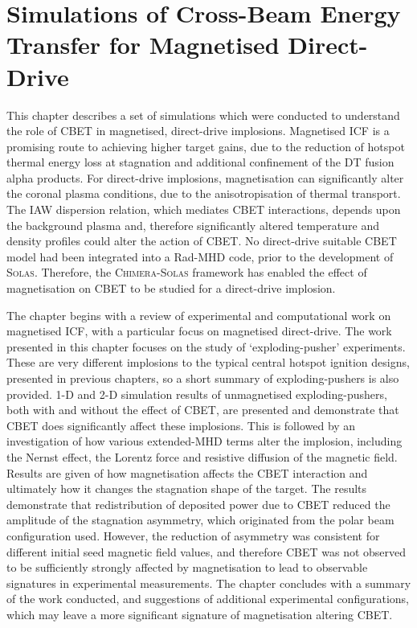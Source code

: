 \chapter{Simulations of Cross-Beam Energy Transfer for Magnetised Direct-Drive}%
\label{chap:Mag}

This chapter describes a set of simulations which were conducted to understand the role of \ac{CBET} in magnetised, direct-drive implosions.
Magnetised \ac{ICF} is a promising route to achieving higher target gains, due to the reduction of hotspot thermal energy loss at stagnation and additional confinement of the DT fusion alpha products.
For direct-drive implosions, magnetisation can significantly alter the coronal plasma conditions, due to the anisotropisation of thermal transport.
The \ac{IAW} dispersion relation, which mediates \ac{CBET} interactions, depends upon the background plasma and, therefore significantly altered temperature and density profiles could alter the action of \ac{CBET}.
No direct-drive suitable \ac{CBET} model had been integrated into a \ac{Rad-MHD} code, prior to the development of \textsc{Solas}.
Therefore, the \textsc{Chimera}-\textsc{Solas} framework has enabled the effect of magnetisation on \ac{CBET} to be studied for a direct-drive implosion.

The chapter begins with a review of experimental and computational work on magnetised \ac{ICF}, with a particular focus on magnetised direct-drive.
The work presented in this chapter focuses on the study of `exploding-pusher' experiments.
These are very different implosions to the typical central hotspot ignition designs, presented in previous chapters, so a short summary of exploding-pushers is also provided.
1-D and 2-D simulation results of unmagnetised exploding-pushers, both with and without the effect of \ac{CBET}, are presented and demonstrate that \ac{CBET} does significantly affect these implosions.
This is followed by an investigation of how various extended-\ac{MHD} terms alter the implosion, including the Nernst effect, the Lorentz force and resistive diffusion of the magnetic field.
Results are given of how magnetisation affects the \ac{CBET} interaction and ultimately how it changes the stagnation shape of the target.
The results demonstrate that redistribution of deposited power due to \ac{CBET} reduced the amplitude of the stagnation asymmetry, which originated from the polar beam configuration used.
However, the reduction of asymmetry was consistent for different initial seed magnetic field values, and therefore \ac{CBET} was not observed to be sufficiently strongly affected by magnetisation to lead to observable signatures in experimental measurements.
The chapter concludes with a summary of the work conducted, and suggestions of additional experimental configurations, which may leave a more significant signature of magnetisation altering \ac{CBET}.

